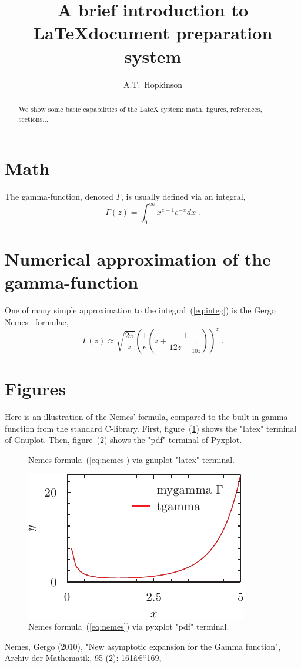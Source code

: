 \documentclass[twocolumn]{article}
\title{A brief introduction to \LaTeX document preparation system}
\author{A.T.~Hopkinson}
\date{}
\begin{document}
\maketitle

\begin{abstract}
We show some basic capabilities of the LateX system: math, figures,
references, sections...
\end{abstract}

\section{Math}
The gamma-function, denoted $\Gamma$, is usually defined via an integral,
	\begin{equation}\label{eq:integ}
\Gamma(z)=\int_0^\infty x^{z-1}e^{-x} dx \;.
	\end{equation}

\section{Numerical approximation of the gamma-function}
One of many simple approximation to the integral~(\ref{eq:integ}) is the Gergo
Nemes~\cite{gergo-nemes} formulae,
	\begin{equation}\label{eq:nemes}
\Gamma(z) \approx \sqrt{\frac{2\pi}{z} } \left(\frac{1}{e} \left(z +
\frac{1}{12z - \frac{1}{10z}}\right)\right)^z \;.
	\end{equation}

\section{Figures}
Here is an illustration of the Nemes' formula, compared to the built-in
gamma function from the standard C-library. First, figure~(\ref{fig:gpl})
shows the "latex" terminal of Gnuplot. Then, figure~(\ref{fig:pyxplot})
shows the "pdf" terminal of Pyxplot.

	\begin{figure}[h]\label{fig:gpl}

\caption{Nemes formula~(\ref{eq:nemes}) via gnuplot "latex" terminal.}
	\end{figure}

	\begin{figure}\label{fig:pyxplot}
\includegraphics{fig-pyxplot.pdf}
\caption{Nemes formula~(\ref{eq:nemes}) via pyxplot "pdf" terminal.}
	\end{figure}

\begin{thebibliography}{9}
 Nemes, Gergo (2010), "New asymptotic expansion
for the Gamma function", Archiv der Mathematik, 95 (2): 161â€“169,
\end{thebibliography}
\end{document}
